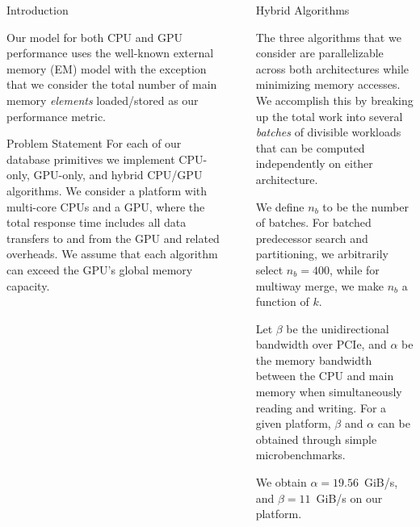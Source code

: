 \documentclass[final]{beamer}
\newlength{\sepwidth}
\newlength{\colwidth}
\newcommand{\separatorcolumn}{\begin{column}{\sepwidth}\end{column}}
\begin{document}
\begin{frame}[t]
\begin{columns}[t]
\begin{column}{\colwidth}
\begin{block}{Introduction}
\begin{description}[font=$\bullet$~\normalfont\scshape\color{red!50!black}]
\item Our model for both CPU and GPU performance uses the well-known external memory (EM) model with the exception that we consider the total number of main memory \emph{elements} loaded/stored as our performance metric.

\end{description}  

  \end{block}

  \begin{alertblock}{Problem Statement}
   For each of our database primitives we implement CPU-only, GPU-only, and hybrid CPU/GPU algorithms. 
   We consider a platform with multi-core CPUs and a GPU, where the total response time includes all 
   data transfers to and from the GPU and related overheads. We assume that each algorithm can exceed the GPU's global memory capacity. 
  \end{alertblock}

\end{column}

\separatorcolumn

\begin{column}{\colwidth}

 \begin{block}{Hybrid Algorithms}

 \begin{description}[font=$\bullet$~\normalfont\scshape\color{red!50!black}]
\item The three algorithms that we consider are parallelizable across both architectures while minimizing memory accesses. We accomplish this by breaking up the total work into several \emph{batches} of divisible workloads that can be computed independently on either architecture. 

\item We define $n_b$ to be the number of batches. For batched predecessor search and partitioning, we arbitrarily select $n_b=400$, while for multiway merge, we make $n_b$ a function of $k$. 

\item Let $\beta$ be the unidirectional bandwidth over PCIe, and $\alpha$ be the memory bandwidth between the CPU and main memory when simultaneously reading and writing. For a given platform, $\beta$ and  $\alpha$ can be obtained through simple microbenchmarks.

\item We obtain $\alpha=19.56$~GiB/s, and $\beta=11$~GiB/s on our platform. 
\end{description} 


\end{block}
\end{column}
\end{columns}
\end{frame}
\end{document}

